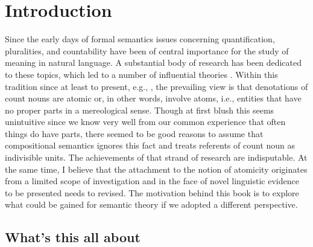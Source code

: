 \chapter{Introduction}\label{ch:introduction}

Since the early days of formal semantics \citep[starting with][]{montague1973proper} issues concerning quantification, pluralities, and countability have been of central importance for the study of meaning in natural language. A substantial body of research has been dedicated to these topics, which led to a number of influential theories \citep[e.g.,][]{barwise_cooper1981generalized,scha1981distributive,link1983logical,hoeksema1983plurality,gillon1987readings,krifka1989nominal,schwarzschild1996pluralities,landman2000events,winter2001flexibility}. Within this tradition since at least \citet{scha1981distributive} to present, e.g., \citet{champollion2017parts}, the prevailing view is that denotations of count nouns are atomic or, in other words, involve atoms, i.e., entities that have no proper parts in a mereological sense. Though at first blush this seems unintuitive since we know very well from our common experience that often things do have parts, there seemed to be good reasons to assume that compositional semantics ignores this fact and treats referents of count noun as indivisible units. The achievements of that strand of research are indisputable. At the same time, I believe that the attachment to the notion of atomicity originates from a limited scope of investigation and in the face of novel linguistic evidence to be presented needs to revised. The motivation behind this book is to explore what could be gained for semantic theory if we adopted a different perspective.

\section{What's this all about}\label{sec:whats-this-all-about}

